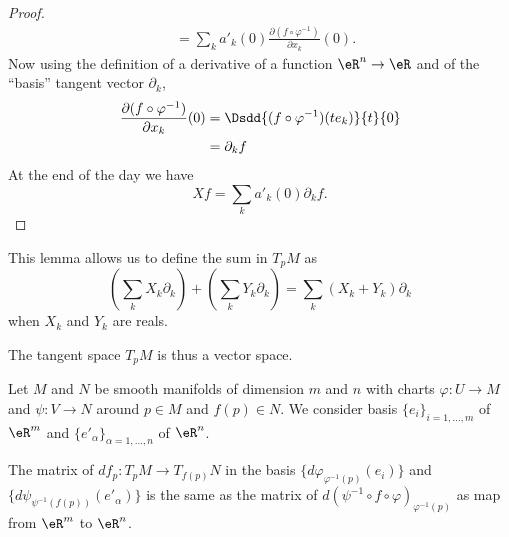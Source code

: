 \begin{proof}
\begin{subequations}
\begin{align}
			   & =\sum_k a'_k(0)\frac{ \partial (f\circ\varphi^{-1}) }{ \partial x_k }(0).
		\end{align}
	\end{subequations}
	Now using the definition of a derivative of a function \( \eR^n\to \eR\) and of the ``basis'' tangent vector \( \partial_k\),
	\begin{subequations}
		\begin{align}
			\frac{ \partial (f\circ\varphi^{-1}) }{ \partial x_k }(0) & =\Dsdd{ (f\circ\varphi^{-1})(te_k) }{t}{0} \\
			                                                          & =\partial_k f
		\end{align}
	\end{subequations}
	At the end of the day we have
	\begin{equation}
		Xf=\sum_k a'_k(0)\partial_kf.
	\end{equation}
\end{proof}

This lemma allows us to define the sum in \( T_pM\) as      %
\begin{equation}
	\left( \sum_kX_k\partial_k \right)+\left( \sum_kY_k\partial_k \right)=\sum_k (X_k+Y_k)\partial_k
\end{equation}
when \( X_k\) and \( Y_k\) are reals.

The tangent space \( T_pM\) is thus a vector space.

\begin{lemma}       \label{LEMooVCSJooEuDZFz}
	Let \( M\) and \( N\) be smooth manifolds of dimension \( m\) and \( n\) with charts \( \varphi\colon U\to M\) and \( \psi\colon V\to N\) around \( p\in M\) and \( f(p)\in N\). We consider basis \( \{ e_i \}_{i=1,\ldots, m}\) of \( \eR^m\) and \( \{ e'_{\alpha} \}_{\alpha=1,\ldots, n}\) of \( \eR^n\).

	The matrix of \( df_p\colon T_pM\to T_{f(p)}N\) in the basis \( \{ d\varphi_{\varphi^{-1}(p)}(e_i) \}\) and \( \{ d\psi_{\psi^{-1}(f(p))}(e'_{\alpha}) \}\) is the same as the matrix of \( d(\psi^{-1}\circ f\circ\varphi)_{\varphi^{-1}(p)}\) as map from \( \eR^m\) to \( \eR^n\).
\end{lemma}

